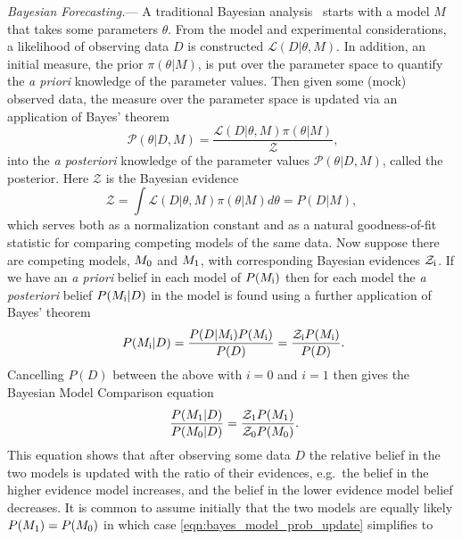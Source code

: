 \documentclass[twocolumn,english,aps,prl,amsmath,amssymb,reprint,footinbib,floatfix,showkeys]{revtex4-2}
\newcommand{\modelz}{M_{\rm 0}}
\newcommand{\modelo}{M_{\rm 1}}
\newcommand{\post}{\mathcal{P}}
\newcommand{\prior}{\pi}
\newcommand{\like}{\mathcal{L}}
\newcommand{\Z}{\mathcal{Z}}
\begin{document}
\textit{Bayesian Forecasting.}---
A traditional Bayesian analysis~\citep[see][for a more detailed discussion]{Mackay_2003} starts with a model $M$ that takes some parameters $\theta$.
From the model and experimental considerations, a likelihood of observing data $D$ is constructed $\like(D | \theta, M)$.
In addition, an initial measure, the prior $\prior(\theta | M)$, is put over the parameter space to quantify the \textit{a priori} knowledge of the parameter values.
Then given some (mock) observed data, the measure over the parameter space is updated via an application of Bayes' theorem
\begin{equation}~\label{eqn:bayes}
    \post(\theta | D, M) = \frac{\like(D | \theta, M) \prior(\theta | M)}{\Z},
\end{equation}
into the \textit{a posteriori} knowledge of the parameter values $\post(\theta | D, M)$, called the posterior. 
Here $\Z$ is the Bayesian evidence
\begin{equation}
    \Z = \int \like(D | \theta, M) \prior(\theta | M) d\theta = P(D | M),
\end{equation}
which serves both as a normalization constant and as a natural goodness-of-fit statistic for comparing competing models of the same data.
Now suppose there are competing models, $\modelz$ and $\modelo$, with corresponding Bayesian evidences $\Z_{\rm i}$.
If we have an \textit{a priori} belief in each model of $P(M_{\rm i})$ then for each model the \textit{a posteriori} belief  $P(M_{\rm i}| D)$ in the model is found using a further application of Bayes' theorem
\begin{equation}~\label{eqn:bayes_on_models}
    P(M_{\rm i}| D) = \frac{P(D | M_{\rm i}) P(M_{\rm i})}{P(D)} = \frac{\Z_{\rm i} P(M_{\rm i})}{P(D)}.
\end{equation}
Cancelling $P(D)$ between the above with $i = 0$ and $i = 1$ then gives the Bayesian Model Comparison equation
\begin{equation}~\label{eqn:bayes_model_prob_update}
    \frac{P(\modelo| D)}{P(\modelz | D)} = \frac{\Z_{\rm 1} P(\modelo)}{\Z_{\rm 0} P(\modelz)}.
\end{equation}
This equation shows that after observing some data $D$ the relative belief in the two models is updated with the ratio of their evidences, e.g.\ the belief in the higher evidence model increases, and the belief in the lower evidence model belief decreases. 
It is common to assume initially that the two models are equally likely $P(\modelo) = P(\modelz)$ in which case \cref{eqn:bayes_model_prob_update} simplifies to
\end{document}
